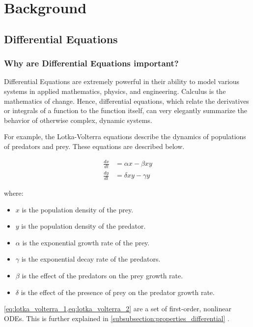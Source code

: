 \section{Background}
\label{section:background}
\subsection{Differential Equations}
\subsubsection{Why are Differential Equations important?}
Differential Equations are extremely powerful in their ability to model various systems in applied mathematics, physics, and engineering. Calculus is the mathematics of change. Hence, differential equations, which relate the derivatives or integrals of a function to the function itself, can very elegantly summarize the behavior of otherwise complex, dynamic systems.

For example, the Lotka-Volterra equations describe the dynamics of populations of predators and prey. These equations are described below.

\begin{align}
    \frac{dx}{dt} &= \alpha x - \beta x y \label{eq:lotka_volterra_1} \\
    \frac{dy}{dt} &= \delta x y - \gamma y \label{eq:lotka_volterra_2}
\end{align}

\noindent
where:
\begin{itemize}
    \item $x$ is the population density of the prey.
    \item $y$ is the population density of the predator.
    \item $\alpha$ is the exponential growth rate of the prey.
    \item $\gamma$ is the exponential decay rate of the predators.
    \item $\beta$ is the effect of the predators on the prey growth rate.
    \item $\delta$ is the effect of the presence of prey on the predator growth rate.
\end{itemize}

\cref{eq:lotka_volterra_1,eq:lotka_volterra_2} are a set of first-order, nonlinear ODEs. This is further explained in \cref{subsubsection:properties_differential} .


